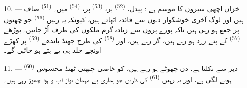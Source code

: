 10. --- خزاں اچھی سیروں کا موسم ہے : پیدل، 
\textsuperscript{(52)} پر،  \textsuperscript{(53)} پر،
 \textsuperscript{(54)} میں۔ 
\textsuperscript{(51)} صاف ہیں اور لوگ آخری خوشگوار دنوں سے فائدہ
اٹھاتے ہیں، کیونکہ یہ رہیں  \textsuperscript{(56)} جو
چھتوں پر جمع ہو رہی ہیں تاکہ پورے پروں سے زیادہ گرم ملکوں کی طرف اُڑ
جائیں۔ بوڑھے  \textsuperscript{(57)} کے پتے زرد
ہو رہے ہیں،  گر رہے ہیں، اور 
\textsuperscript{(58)} کی طرح جھنڈ باندھے 
\textsuperscript{(59)} پر کھڑے اونچے  جلد ہی بے پتے ہو
جائیں گے۔

11. ---  \textsuperscript{(60)} دیر سے نکلتا ہے، دن چھوٹے
ہو رہے ہیں،  کو خاصی چبھتی ٹھنڈ محسوس ہونے لگی ہے، اور یہ
رہیں  \textsuperscript{(61)} کی ڈاریں جو ہماری بے مہمان
نواز آب و ہوا چھوڑ رہی ہیں۔

\VUsaut{6.0mm}
\VUfilet{22mm}

